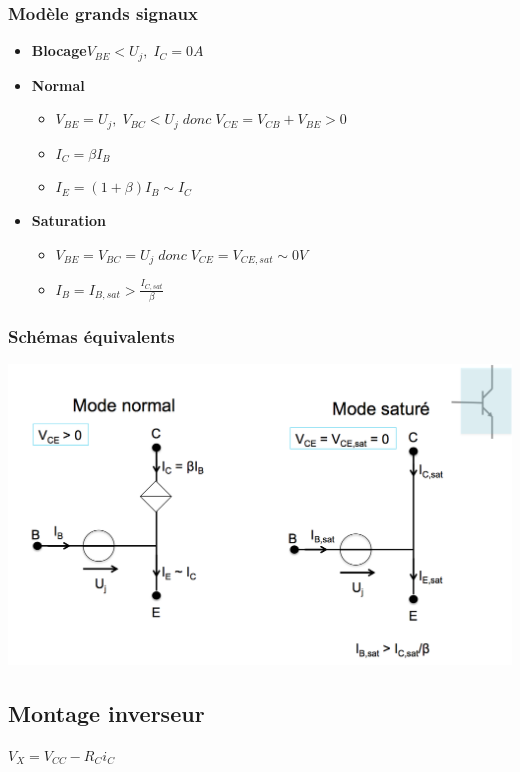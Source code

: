 \documentclass[]{article}
\begin{document}
\subsubsection {Modèle grands signaux}
\begin{itemize}
\item \textbf{Blocage}$ V_{BE} < U_j ,\; I_C = 0A$
\item \textbf{Normal} 
\begin{itemize}
\item $V_{BE} = U_j , \; V_{BC} < U_j \;donc\; V_{CE}=V_{CB} + V_{BE} > 0 $

\item $I_C = \beta I_B $

\item $ I_E = (1+\beta)I_B \sim I_C $
\end{itemize}

\item \textbf{Saturation} 
\begin{itemize}
\item $ V_{BE} = V_{BC} = U_j \; donc\; V_{CE} = V_{CE,sat} \sim 0V$
\item $ I_B = I_{B,sat} > \frac{I_{C,sat}}{\beta} $ 
\end{itemize}
\end{itemize}

\subsubsection{Schémas équivalents}
\includegraphics[scale=0.5]{schema_eq}
\subsection{Montage inverseur}
$V_X = V_{CC} - R_Ci_C$
\end{document}
